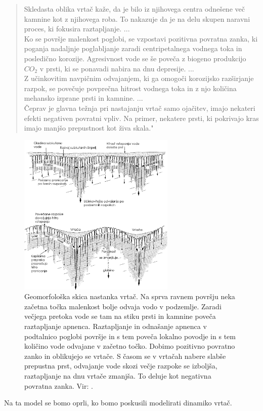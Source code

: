 \documentclass[a4paper, twoside, 12pt]{book}
\begin{document}
\begin{quotation}
Skledasta oblika vrtač kaže, da je bilo iz njihovega centra odnešene več kamnine kot z njihovega roba. To nakazuje da je na delu skupen naravni proces, ki fokusira raztapljanje. ... \\
Ko se površje malenkost poglobi, se vzpostavi pozitivna povratna zanka, ki poganja nadaljnje poglabljanje zaradi centripetalnega vodnega toka in posledično korozije. Agresivnost vode se še poveča z biogeno produkcijo $CO_2$ v prsti, ki se ponavadi nabira na dnu depresije. ... \\
Z učinkovitim navpičnim odvajanjem, ki ga omogoči korozijsko razširjanje razpok, se povečuje povprečna hitrost vodnega toka in z njo količina mehansko izprane prsti in kamnine. ... \\
Čeprav je glavna težnja pri nastajanju vrtač samo ojačitev, imajo nekateri efekti negativen povratni vpliv. Na primer, nekatere prsti, ki pokrivajo kras imajo manjšo prepustnost kot živa skala."
\end{quotation}
\begin{figure}[h!]
  \begin{center}
    \includegraphics[width=7.5cm]{slike/vrtaca-ford-williams.jpg}
  \end{center}
  \caption{Geomorfološka skica nastanka vrtač. Na sprva ravnem površju neka začetna točka malenkost bolje odvaja vodo v podzemlje. Zaradi večjega pretoka vode se tam na stiku prsti in kamnine poveča raztapljanje apnenca. Raztapljanje in odnašanje apnenca v podtalnico poglobi površje in s tem poveča lokalno povodje in s tem količino vode odvajane v začetno točko. Dobimo pozitivno povratno zanko in oblikujejo se vrtače. S časom se v vrtačah nabere slabše prepustna prst, odvajanje vode skozi večje razpoke se izboljša, raztapljanje na dnu vrtače zmanjša. To deluje kot negativna povratna zanka. Vir: \cite{ford2007karst}.}
\label{fig:vrtaca-ford-williams}
\end{figure}
Na ta model se bomo oprli, ko bomo poskusili modelirati dinamiko vrtač.
\end{document}
